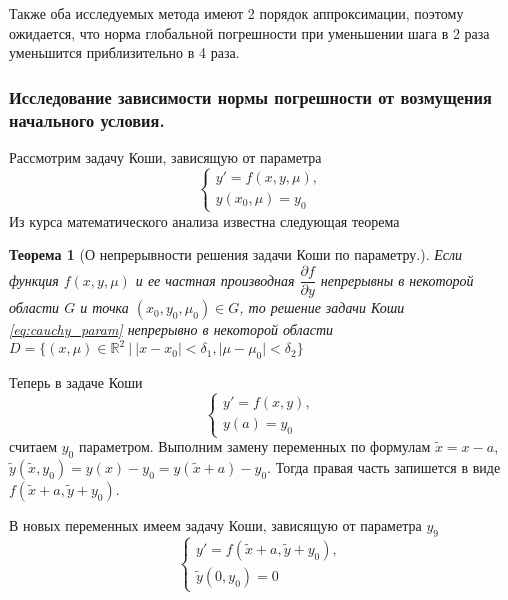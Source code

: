 \documentclass[a4paper, 12pt]{article}
\theoremstyle{mythm}
\newtheorem{theorem}{Теорема}
\begin{document}
	Также оба исследуемых метода имеют 2 порядок аппроксимации, поэтому ожидается, что норма глобальной погрешности при уменьшении шага в 2 раза уменьшится приблизительно в 4 раза.
	
	\subsubsection{Исследование зависимости нормы погрешности от возмущения начального условия.}
	
	Рассмотрим задачу Коши, зависящую от параметра
	\begin{equation} \label{eq:cauchy_param}
		\begin{cases}
			y' = f(x,y,\mu),\\
			y(x_0,\mu) = y_0
		\end{cases}
	\end{equation}
	Из курса математического анализа известна следующая теорема
	\begin{theorem}[О непрерывности решения задачи Коши по параметру.] \label{th:param}
		Если функция $f(x,y,\mu)$ и ее частная производная $\dfrac{\partial f}{\partial y}$ непрерывны в некоторой области $G$ и точка $(x_0, y_0, \mu_0)\in G$, то решение задачи Коши \eqref{eq:cauchy_param} непрерывно в некоторой области $D =\{(x,\mu)\in\mathbb{R}^2\ |\ |x-x_0|<\delta_1, |\mu-\mu_0|<\delta_2\}$
	\end{theorem}

	Теперь в задаче Коши
	\begin{equation}
		\begin{cases} \label{eq:cauchy_task_x0}
			y' = f(x,y),\\
			y(a) = y_0
		\end{cases}
	\end{equation} считаем $y_0$ параметром. Выполним замену переменных по формулам $\widetilde{x} = x - a$, $\widetilde{y}(\widetilde{x}, y_0) = y(x) - y_0 = y(\widetilde{x} + a) - y_0$. Тогда правая часть запишется в виде $f(\widetilde{x} + a, \widetilde{y} + y_0)$.

	В новых переменных имеем задачу Коши, зависящую от параметра $y_9$
	\begin{equation}
		\begin{cases} \label{eq:cauchy_task_tilde}
			y' = f(\widetilde{x} + a, \widetilde{y} + y_0),\\
			\widetilde{y}(0, y_0) = 0
		\end{cases}
	\end{equation}
\end{document}
